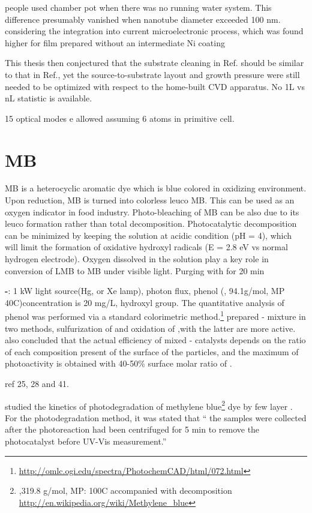 people used chamber pot when there was no running water system. 
This difference presumably vanished when nanotube diameter exceeded 100 nm. considering the integration into current microelectronic process, which was found higher for film prepared without an intermediate Ni coating

This thesis then conjectured that the substrate cleaning in Ref.\cite{Peimyoo2013} should be similar to that in Ref.\cite{VanderZande2013}, yet the source-to-substrate layout and growth pressure were still needed to be optimized with respect to the home-built CVD apparatus. No 1L vs nL statistic is available.


15 optical modes e allowed assuming 6 atoms in primitive cell.




\section{MB}

MB is a heterocyclic aromatic dye which is blue colored in oxidizing environment. Upon reduction, MB is turned into colorless leuco MB. This can be used as an oxygen indicator in food industry. Photo-bleaching of MB can be also due to its leuco formation rather than total decomposition. Photocatalytic decomposition can be minimized by keeping the solution at acidic condition (pH = 4), which will limit the formation of oxidative hydroxyl radicals (E = 2.8 eV vs normal hydrogen electrode). Oxygen dissolved in the solution play a key role in conversion of LMB to MB under visible light. Purging with  for 20 min


\textbf{-}: 1 kW light source(Hg, or Xe lamp), photon flux, phenol (, 94.1g/mol, MP 40C)concentration is 20 mg/L, hydroxyl group. The quantitative analysis of phenol was performed via a standard colorimetric method.\footnote{\url{http://omlc.ogi.edu/spectra/PhotochemCAD/html/072.html}}
\citeauthor{DiPaola1999} prepared - mixture in two methods, sulfurization of  and oxidation of ,with the latter are more active.
\citeauthor{DiPaola1999} also concluded that the actual efficiency of mixed - catalysts depends on the ratio of each composition present of the surface of the particles, and the maximum of photoactivity is obtained with 40-50\% surface molar ratio of .

ref 25, 28 and 41.

\citeauthor{Sreedhara2013} studied the kinetics of photodegradation of methylene blue\footnote{,319.8 g/mol, MP: 100C accompanied with decomposition \url{http://en.wikipedia.org/wiki/Methylene_blue}} dye by few layer .
For the photodegradation method, it was stated that `` the samples were collected after the photoreaction had been centrifuged for 5 min to remove the photocatalyst before UV-Vis measurement.''


